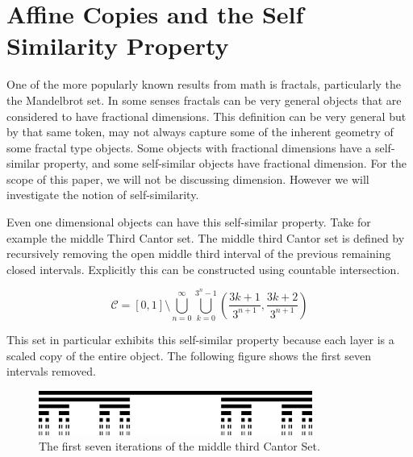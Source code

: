 \section{Affine Copies and the Self Similarity Property}

One of the more popularly known results from math is fractals, particularly the the Mandelbrot set.  In some senses fractals can be very general objects that are considered to have fractional dimensions.  This definition can be very general but by that same token, may not always capture some of the inherent geometry of some fractal type objects. Some objects with fractional dimensions have a self-similar property, and some self-similar objects have fractional dimension.  For the scope of this paper, we will not be discussing dimension. However we will investigate the notion of self-similarity. 


Even one dimensional objects can have this self-similar property. Take for example the middle Third Cantor set.  The middle third Cantor set is defined by recursively removing the open middle third interval of the previous remaining closed intervals.  Explicitly this can be constructed using countable intersection.  

\begin{example}\label{middleThirdCantor}
    $$\mathcal{C} = [0,1] \setminus \bigcup_{n=0}^\infty\bigcup_{k=0}^{3^n-1}\left(\frac{3k+1}{3^{n+1}},\frac{3k+2}{3^{n+1}}\right)$$
\end{example}

This set in particular exhibits this self-similar property because each layer is a scaled copy of the entire object.  The following figure shows the first seven intervals removed.  

\begin{figure}[h]
    \includegraphics[width=0.8\textwidth]{Content/Images/Cantor_set_in_seven_iterations.jpg}
    \centering
    \caption{The first seven iterations of the middle third Cantor Set.}
\end{figure}

